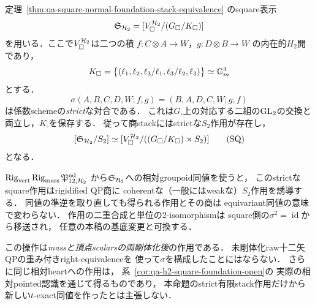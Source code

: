 \begin{proposition}
\label{prop:qa-q12-strict-square-s2-coherence}
定理~\ref{thm:qa-square-normal-foundation-stack-equivalence}
のsquare表示
\[
 \mathfrak S_{\mathcal H_2}
  =[V_\square^{\mathcal H_2}/(G_\square/K_\square)]
\]
を用いる．ここで$V_\square^{\mathcal H_2}$は二つの積
$f:C\otimes A\to W$，$g:D\otimes B\to W$
の内在的$H_2$開であり，
\[
 K_\square=
 \bigl\{(\ell_1,\ell_2,
 \ell_3/\ell_1,\ell_3/\ell_2,\ell_3)\bigr\}
 \simeq\mathbb G_m^3
\]
とする．
\[
 \sigma(A,B,C,D,W;f,g)
       =(B,A,D,C,W;g,f)
 \tag{SS}\label{eq:qa-q12-strict-square-swap}
\]
は係数schemeの\emph{strict}な対合である．
これは$G_\square$上の対応する二組の$\operatorname{GL}_2$の交換と
両立し，$K_\square$を保存する．
従って商stackにはstrictな$S_2$作用が存在し，
\[
 [\mathfrak S_{\mathcal H_2}/S_2]
 \simeq
 [V_\square^{\mathcal H_2}/
          ((G_\square/K_\square)\rtimes S_2)]
 \tag{SQ}\label{eq:qa-q12-strict-square-stack-quotient}
\]
となる．

$\operatorname{Rig}_{\mathrm{vert}}
\operatorname{Rig}_{\mathrm{mass}}
 \mathfrak P_{12,\mathcal H_2}^{\mathrm{nd}}$
から$\mathfrak S_{\mathcal H_2}$への相対groupoid同値を使うと，
このstrictなsquare作用はrigidified QP商に
coherentな（一般にはweakな）$S_2$作用を誘導する．
同値の準逆を取り直しても得られる作用とその商は
equivariant同値の意味で変わらない．
作用の二重合成と単位の2-isomorphismは
square側の$\sigma^2=\operatorname{id}$から移送され，
任意の本稿の基底変更と可換する．

この操作は\emph{massと頂点scalarsの両剛体化後}の作用である．
未剛体化raw十二矢QPの重み付きright-equivalenceを
使って$\sigma$を構成したことにはならない．
さらに同じ相対heartへの作用は，
系~\ref{cor:qa-h2-square-foundation-open}の
実際の相対pointed認識を通じて得るものであり，
本命題のstrict有限stack作用だけから
新しい$t$-exact同値を作ったとは主張しない．
\end{proposition}
